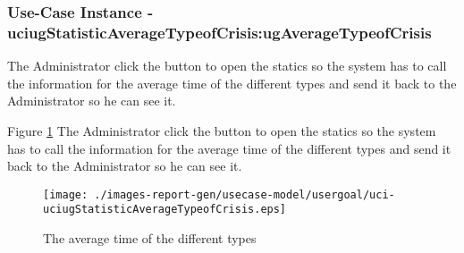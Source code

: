 
	\subsubsection{Use-Case Instance - uciugStatisticAverageTypeofCrisis:ugAverageTypeofCrisis}
	
	The Administrator click the button to open the statics so the system has to call the information for the average time of the different types and send it back to the Administrator so he can see it. 		  
	\begin{operationmodel}
	
	\end{operationmodel} 

	
	Figure \ref{fig:lu.uni.lassy.excalibur.examples.icrash-RE-UC-uci-uciugStatisticAverageTypeofCrisis}
	The Administrator click the button to open the statics so the system has to call the information for the average time of the different types and send it back to the Administrator so he can see it. 
	
	\begin{figure}[htbp]
	\begin{center}
	
	\texttt{[image: ./images-report-gen/usecase-model/usergoal/uci-uciugStatisticAverageTypeofCrisis.eps]}
	\end{center}
	\caption[lu.uni.lassy.excalibur.examples.icrash Sequence Diagram: uci-uciugStatisticAverageTypeofCrisis]{The average time of the different types}
	\label{fig:lu.uni.lassy.excalibur.examples.icrash-RE-UC-uci-uciugStatisticAverageTypeofCrisis}
	\end{figure}
	\vspace{0.5cm}
